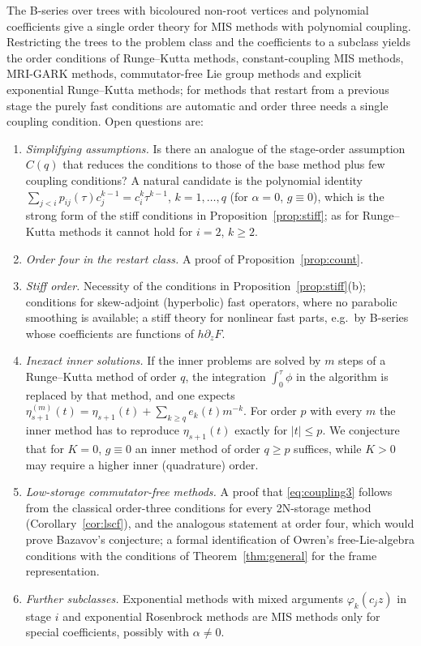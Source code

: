 \documentclass[11pt,a4paper]{article}
\theoremstyle{definition}
\theoremstyle{remark}
\begin{document}
The B-series over trees with bicoloured non-root vertices and polynomial coefficients give a single order theory for MIS
methods with polynomial coupling. Restricting the trees to the problem class and the coefficients to a subclass yields
the order conditions of Runge--Kutta methods, constant-coupling MIS methods, MRI-GARK methods, commutator-free Lie group
methods and explicit exponential Runge--Kutta methods; for methods that restart from a previous stage the purely fast conditions are automatic and order
three needs a single coupling condition. Open questions are:
\begin{enumerate}
\item \emph{Simplifying assumptions.} Is there an analogue of the stage-order assumption $C(q)$ that reduces the
  conditions to those of the base method plus few coupling conditions? A natural candidate is the polynomial identity
  $\sum_{j<i}p_{ij}(\tau)c_j^{k-1}=c_i^k\tau^{k-1}$, $k=1,\dots,q$ (for $\alpha=0$, $g\equiv0$), which is the strong form of
  the stiff conditions in Proposition~\ref{prop:stiff}; as for Runge--Kutta methods it cannot hold for $i=2$, $k\ge2$.
\item \emph{Order four in the restart class.} A proof of Proposition~\ref{prop:count}.
\item \emph{Stiff order.} Necessity of the conditions in Proposition~\ref{prop:stiff}(b); conditions for skew-adjoint
  (hyperbolic) fast operators, where no parabolic smoothing is available; a stiff theory for nonlinear fast parts, e.g.\
  by B-series whose coefficients are functions of $h\partial_zF$.
\item \emph{Inexact inner solutions.} If the inner problems are solved by $m$ steps of a Runge--Kutta method of order $q$,
  the integration $\int_0^\tau\phi$ in the algorithm is replaced by that method, and one expects
  $\eta^{(m)}_{s+1}(t)=\eta_{s+1}(t)+\sum_{k\ge q}e_k(t)m^{-k}$. For order $p$ with every $m$ the inner method has to
  reproduce $\eta_{s+1}(t)$ exactly for $|t|\le p$. We conjecture that for $K=0$, $g\equiv0$ an inner method of order
  $q\ge p$ suffices, while $K>0$ may require a higher inner (quadrature) order.
\item \emph{Low-storage commutator-free methods.} A proof that \eqref{eq:coupling3} follows from the classical order-three
  conditions for every 2N-storage method (Corollary~\ref{cor:lscf}), and the analogous statement at order four, which
  would prove Bazavov's conjecture; a formal identification of Owren's free-Lie-algebra conditions with the conditions
  of Theorem~\ref{thm:general} for the frame representation.
\item \emph{Further subclasses.} Exponential methods with mixed arguments $\varphi_k(c_jz)$ in stage $i$ and exponential Rosenbrock
  methods \cite{HochbruckOstermannSchweitzer2009} are MIS methods only for special coefficients, possibly with
  $\alpha\ne0$.
\end{enumerate}
\end{document}
